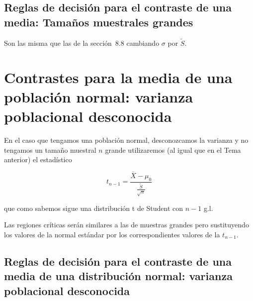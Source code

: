 \documentclass[12pt]{report}
\begin{document}
 
\subsection{Reglas de decisión para el contraste de una media: Tamaños muestrales grandes}


Son las misma que las de la sección~8.8 cambiando $\sigma$ por $\tilde{S}$.

\section{Contrastes para la media de una población normal:
    varianza poblacional desconocida}

    En el caso que tengamos una población normal, desconozcamos la
    varianza y no tengamos un tamaño  muestral $n$ grande utilizaremos
    (al igual que en el Tema anterior) el estadístico

    $$t_{n-1}= \frac{\overline{X}-\mu_{0}}{\frac{\tilde{S}}{\sqrt{n}}}$$

    que como sabemos sigue una distribución t de Student con $n-1$ g.l.

Las regiones críticas serán similares a las de muestras grandes pero sustituyendo los
valores de la normal estándar por los correspondientes valores de la $t_{n-1}$.



\subsection{Reglas de decisión para el contraste de una media de una distribución normal: varianza poblacional  desconocida}
\end{document}
